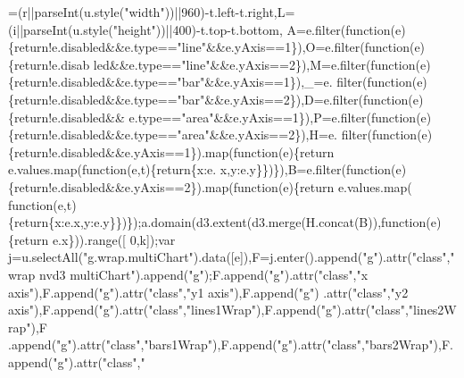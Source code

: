 \begin{DoxyCode}
      =(r||parseInt(u.style(\textcolor{stringliteral}{"width"}))||960)-t.left-t.right,L=(i||parseInt(u.style(\textcolor{stringliteral}{"height"}))||400)-t.top-t.bottom,
      A=e.filter(\textcolor{keyword}{function}(e)\{\textcolor{keywordflow}{return}!e.disabled&&e.type==\textcolor{stringliteral}{"line"}&&e.yAxis==1\}),O=e.filter(\textcolor{keyword}{function}(e)\{return!e.disab
      led&&e.type==\textcolor{stringliteral}{"line"}&&e.yAxis==2\}),M=e.filter(\textcolor{keyword}{function}(e)\{\textcolor{keywordflow}{return}!e.disabled&&e.type==\textcolor{stringliteral}{"bar"}&&e.yAxis==1\}),\_=e.
      filter(\textcolor{keyword}{function}(e)\{return!e.disabled&&e.type==\textcolor{stringliteral}{"bar"}&&e.yAxis==2\}),D=e.filter(\textcolor{keyword}{function}(e)\{\textcolor{keywordflow}{return}!e.disabled&&
      e.type==\textcolor{stringliteral}{"area"}&&e.yAxis==1\}),P=e.filter(\textcolor{keyword}{function}(e)\{return!e.disabled&&e.type==\textcolor{stringliteral}{"area"}&&e.yAxis==2\}),H=e.
      filter(\textcolor{keyword}{function}(e)\{\textcolor{keywordflow}{return}!e.disabled&&e.yAxis==1\}).map(\textcolor{keyword}{function}(e)\{\textcolor{keywordflow}{return} e.values.map(\textcolor{keyword}{function}(e,t)\{\textcolor{keywordflow}{return}\{x:e.
      x,y:e.y\}\})\}),B=e.filter(\textcolor{keyword}{function}(e)\{\textcolor{keywordflow}{return}!e.disabled&&e.yAxis==2\}).map(\textcolor{keyword}{function}(e)\{\textcolor{keywordflow}{return} e.values.map(\textcolor{keyword}{
      function}(e,t)\{\textcolor{keywordflow}{return}\{x:e.x,y:e.y\}\})\});a.domain(d3.extent(d3.merge(H.concat(B)),\textcolor{keyword}{function}(e)\{\textcolor{keywordflow}{return} e.x\})).range([
      0,k]);var j=u.selectAll(\textcolor{stringliteral}{"g.wrap.multiChart"}).data([e]),F=j.enter().append(\textcolor{stringliteral}{"g"}).attr(\textcolor{stringliteral}{"class"},\textcolor{stringliteral}{"wrap nvd3
       multiChart"}).append(\textcolor{stringliteral}{"g"});F.append(\textcolor{stringliteral}{"g"}).attr(\textcolor{stringliteral}{"class"},\textcolor{stringliteral}{"x axis"}),F.append(\textcolor{stringliteral}{"g"}).attr(\textcolor{stringliteral}{"class"},\textcolor{stringliteral}{"y1 axis"}),F.append(\textcolor{stringliteral}{"g"})
      .attr(\textcolor{stringliteral}{"class"},\textcolor{stringliteral}{"y2 axis"}),F.append(\textcolor{stringliteral}{"g"}).attr(\textcolor{stringliteral}{"class"},\textcolor{stringliteral}{"lines1Wrap"}),F.append(\textcolor{stringliteral}{"g"}).attr(\textcolor{stringliteral}{"class"},\textcolor{stringliteral}{"lines2Wrap"}),F
      .append(\textcolor{stringliteral}{"g"}).attr(\textcolor{stringliteral}{"class"},\textcolor{stringliteral}{"bars1Wrap"}),F.append(\textcolor{stringliteral}{"g"}).attr(\textcolor{stringliteral}{"class"},\textcolor{stringliteral}{"bars2Wrap"}),F.append(\textcolor{stringliteral}{"g"}).attr(\textcolor{stringliteral}{"class"},\textcolor{stringliteral}{"
}
\end{DoxyCode}
